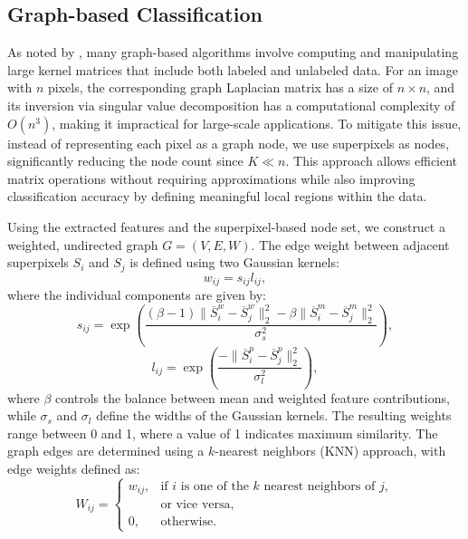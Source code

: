 \subsection{Graph-based Classification} \label{sec:graphclass}

As noted by \citet{campsvalls2007}, many graph-based algorithms involve computing and manipulating large kernel matrices that include both labeled and unlabeled data. For an image with \( n \) pixels, the corresponding graph Laplacian matrix has a size of \( n \times n \), and its inversion via singular value decomposition has a computational complexity of \( O(n^3) \), making it impractical for large-scale applications. To mitigate this issue, instead of representing each pixel as a graph node, we use superpixels as nodes, significantly reducing the node count since \( K \ll n \). This approach allows efficient matrix operations without requiring approximations while also improving classification accuracy by defining meaningful local regions within the data.

Using the extracted features and the superpixel-based node set, we construct a weighted, undirected graph \( G = (V, E, W) \). The edge weight between adjacent superpixels \( S_i \) and \( S_j \) is defined using two Gaussian kernels:  
\begin{equation} \label{equ:graph_weight}
    w_{ij} = s_{ij}l_{ij},
\end{equation}  
where the individual components are given by:  
\begin{equation} \label{equ:sigma_s}
    s_{ij} = \exp\left(\frac{(\beta-1)\|\overline{S}_i^w - \overline{S}_j^w\|_2^2 - \beta\|\overline{S}_i^m - \overline{S}_j^m\|_2^2}{\sigma_s^2}\right),
\end{equation}  
\begin{equation} \label{equ:sigma_l}
    l_{ij} = \exp\left(\frac{-\|\overline{S}_i^p - \overline{S}_j^p\|_2^2}{\sigma_l^2}\right),
\end{equation}  
where \( \beta \) controls the balance between mean and weighted feature contributions, while \( \sigma_s \) and \( \sigma_l \) define the widths of the Gaussian kernels. The resulting weights range between 0 and 1, where a value of 1 indicates maximum similarity. The graph edges are determined using a \( k \)-nearest neighbors (KNN) approach, with edge weights defined as:  
\begin{equation} \label{equ:knn_graph}
    W_{ij} = \begin{cases}
    w_{ij}, & \text{if } i \text{ is one of the } k \text{ nearest neighbors of } j, \\
    & \text{or vice versa}, \\
    0,       & \text{otherwise}.
    \end{cases}
\end{equation}  

